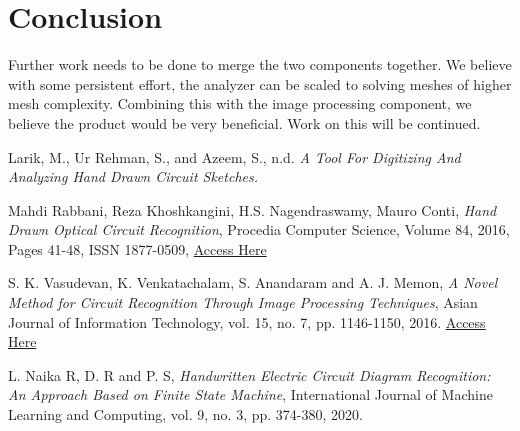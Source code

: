 \documentclass[conference]{IEEEtran}
\begin{document}
\newpage

\section{\textbf{Conclusion}}
Further work needs to be done to merge the two components together. We believe with some persistent effort, the analyzer can be scaled to solving meshes of higher mesh complexity. Combining this with the image processing component, we believe the product would be very beneficial. Work on this will be continued. 


\begin{thebibliography}{00}

Larik, M., Ur Rehman, S., and Azeem, S., n.d. \textit{A Tool For Digitizing And Analyzing Hand Drawn Circuit Sketches.}

Mahdi Rabbani, Reza Khoshkangini, H.S. Nagendraswamy, Mauro Conti,
\textit{Hand Drawn Optical Circuit Recognition}, Procedia Computer Science,
Volume 84,
2016,
Pages 41-48,
ISSN 1877-0509,
\href{https://www.sciencedirect.com/science/article/pii/S1877050916300783}{Access Here}

S. K. Vasudevan, K. Venkatachalam, S. Anandaram and A. J. Memon, \textit{A Novel Method for Circuit Recognition Through Image Processing Techniques}, Asian Journal of Information Technology, vol. 15, no. 7, pp. 1146-1150, 2016. \href{https://www.scopus.com/inward/record.uri?eid=2-s2.0-84975519853&partnerID=40&md5=079e85950109992c1991a272f31fc35b}{Access Here}

L. Naika R, D. R and P. S, \textit{Handwritten Electric Circuit Diagram Recognition: An Approach Based on Finite State Machine}, International Journal of Machine Learning and Computing, vol. 9, no. 3, pp. 374-380, 2020.
\end{thebibliography}
\end{document}
